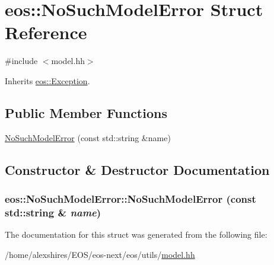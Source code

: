 \hypertarget{structeos_1_1NoSuchModelError}{
\section{eos::NoSuchModelError Struct Reference}
\label{structeos_1_1NoSuchModelError}
}


{\ttfamily \#include $<$model.hh$>$}

Inherits \hyperlink{classeos_1_1Exception}{eos::Exception}.\subsection*{Public Member Functions}
\begin{DoxyCompactItemize}
\item 
\hyperlink{structeos_1_1NoSuchModelError_a2659306f126d1ab6198c127101529241}{NoSuchModelError} (const std::string \&name)
\end{DoxyCompactItemize}


\subsection{Constructor \& Destructor Documentation}
\hypertarget{structeos_1_1NoSuchModelError_a2659306f126d1ab6198c127101529241}{
\subsubsection[{NoSuchModelError}]{\setlength{\rightskip}{0pt plus 5cm}eos::NoSuchModelError::NoSuchModelError (const std::string \& {\em name})}}
\label{structeos_1_1NoSuchModelError_a2659306f126d1ab6198c127101529241}


The documentation for this struct was generated from the following file:\begin{DoxyCompactItemize}
\item 
/home/alexshires/EOS/eos-\/next/eos/utils/\hyperlink{model_8hh}{model.hh}\end{DoxyCompactItemize}
